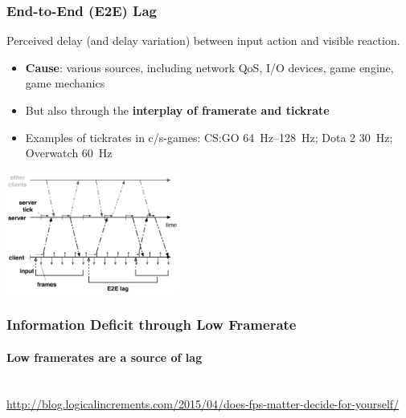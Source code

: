 \documentclass{UDEbeamerEN}
\begin{document}
\begin{frame}
	\frametitle{End-to-End (E2E) Lag}

	\begin{definition}
		Perceived delay (and delay variation) between input action and visible reaction.
	\end{definition}
	\vspace{-3mm}
	\begin{itemize}
		\item \textbf{Cause}: various sources, including network QoS, I/O devices, game engine, game mechanics
		\item But also through the \textbf{interplay of framerate and tickrate}
		\item Examples of tickrates in c/s-games: CS:GO \SIrange{64}{128}{\hertz}; Dota 2 \SI{30}{\hertz}; Overwatch \SI{60}{\hertz}
	\end{itemize}

	\pause
	\vspace{-3mm}
	\begin{center}
		\includegraphics[height=4cm]{../../../models/tickrate-timeseries-poster.pdf}
	\end{center}

\end{frame}


\begin{frame}
	\frametitle{Information Deficit through Low Framerate}
	\framesubtitle{Low framerates are a source of lag}

	\begin{center}
		\\
		{\tiny\url{http://blog.logicalincrements.com/2015/04/does-fps-matter-decide-for-yourself/}}
	\end{center}
\end{frame}
\end{document}
